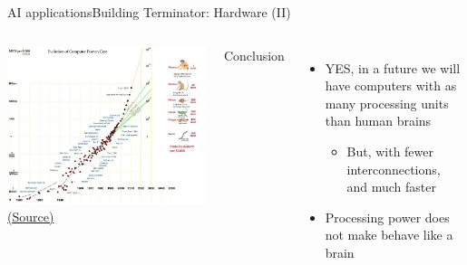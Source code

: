 \documentclass[10pt,compress]{beamer} %
\begin{document}
\begin{frame}{AI applications}{Building Terminator: Hardware (II)}
	\begin{columns}
	\begin{center}
		\includegraphics[width=\linewidth]{figs/power.jpg}\\
		\tiny{\href{http://www.sjef.nu/a-basic-introduction-to-singularity-skepticism/}{(Source)}}
	\end{center}
	Conclusion
	\begin{itemize}
		\item YES, in a future we will have computers with as many processing units than human brains
		\begin{itemize}
		\item But, with fewer interconnections, and much faster
		\end{itemize}
		\item Processing power does not make behave like a brain
	\end{itemize}
	\end{columns}
\end{frame}
\end{document}
